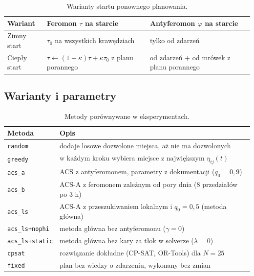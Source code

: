 \documentclass[11pt,a4paper]{article}
\begin{document}
\begin{table}[h]
\centering
\caption{Warianty startu ponownego planowania.}
\begin{tabular}{lll}
\toprule
Wariant & Feromon $\tau$ na starcie & Antyferomon $\varphi$ na starcie \\
\midrule
Zimny start & $\tau_0$ na wszystkich krawędziach & tylko od zdarzeń \\
Ciepły start & $\tau \leftarrow (1-\kappa)\tau + \kappa\tau_0$ z planu porannego & od zdarzeń + od mrówek z planu porannego \\
\bottomrule
\end{tabular}
\end{table}

\subsection{Warianty i parametry}

\begin{table}[h]
\centering
\caption{Metody porównywane w eksperymentach.}
\begin{tabular}{ll}
\toprule
Metoda & Opis \\
\midrule
\texttt{random} & dodaje losowe dozwolone miejsca, aż nie ma dozwolonych \\
\texttt{greedy} & w każdym kroku wybiera miejsce z największym $\eta_{ij}(t)$ \\
\texttt{acs\_a} & ACS z antyferomonem, parametry z dokumentacji ($q_0 = 0{,}9$) \\
\texttt{acs\_b} & ACS-A z feromonem zależnym od pory dnia (8 przedziałów po 3 h) \\
\texttt{acs\_ls} & ACS-A z przeszukiwaniem lokalnym i $q_0 = 0{,}5$ (metoda główna) \\
\texttt{acs\_ls+nophi} & metoda główna bez antyferomonu ($\gamma = 0$) \\
\texttt{acs\_ls+static} & metoda główna bez kary za tłok w solverze ($\lambda = 0$) \\
\texttt{cpsat} & rozwiązanie dokładne (CP-SAT, OR-Tools) dla $N = 25$ \\
\texttt{fixed} & plan bez wiedzy o zdarzeniu, wykonany bez zmian \\
\bottomrule
\end{tabular}
\end{table}
\end{document}
